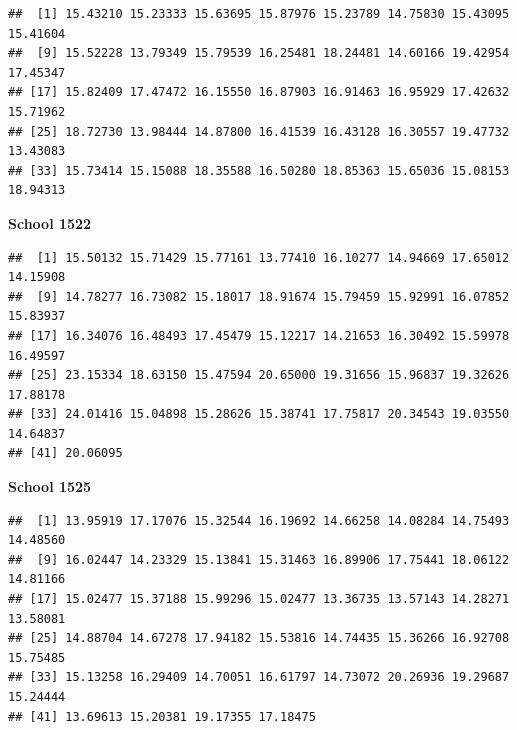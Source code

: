 \documentclass[
  12pt,
]{book}
\newenvironment{Shaded}{\begin{snugshade}}{\end{snugshade}}
\newcommand{\AttributeTok}[1]{\textcolor[rgb]{0.77,0.63,0.00}{#1}}
\newcommand{\DecValTok}[1]{\textcolor[rgb]{0.00,0.00,0.81}{#1}}
\newcommand{\FunctionTok}[1]{\textcolor[rgb]{0.00,0.00,0.00}{#1}}
\newcommand{\NormalTok}[1]{#1}
\newcommand{\SpecialCharTok}[1]{\textcolor[rgb]{0.00,0.00,0.00}{#1}}
\begin{document}
\begin{verbatim}
##  [1] 15.43210 15.23333 15.63695 15.87976 15.23789 14.75830 15.43095 15.41604
##  [9] 15.52228 13.79349 15.79539 16.25481 18.24481 14.60166 19.42954 17.45347
## [17] 15.82409 17.47472 16.15550 16.87903 16.91463 16.95929 17.42632 15.71962
## [25] 18.72730 13.98444 14.87800 16.41539 16.43128 16.30557 19.47732 13.43083
## [33] 15.73414 15.15088 18.35588 16.50280 18.85363 15.65036 15.08153 18.94313
\end{verbatim}

\textbf{School 1522}

\begin{Shaded}
\end{Shaded}

\begin{verbatim}
##  [1] 15.50132 15.71429 15.77161 13.77410 16.10277 14.94669 17.65012 14.15908
##  [9] 14.78277 16.73082 15.18017 18.91674 15.79459 15.92991 16.07852 15.83937
## [17] 16.34076 16.48493 17.45479 15.12217 14.21653 16.30492 15.59978 16.49597
## [25] 23.15334 18.63150 15.47594 20.65000 19.31656 15.96837 19.32626 17.88178
## [33] 24.01416 15.04898 15.28626 15.38741 17.75817 20.34543 19.03550 14.64837
## [41] 20.06095
\end{verbatim}

\textbf{School 1525}

\begin{Shaded}
\end{Shaded}

\begin{verbatim}
##  [1] 13.95919 17.17076 15.32544 16.19692 14.66258 14.08284 14.75493 14.48560
##  [9] 16.02447 14.23329 15.13841 15.31463 16.89906 17.75441 18.06122 14.81166
## [17] 15.02477 15.37188 15.99296 15.02477 13.36735 13.57143 14.28271 13.58081
## [25] 14.88704 14.67278 17.94182 15.53816 14.74435 15.36266 16.92708 15.75485
## [33] 15.13258 16.29409 14.70051 16.61797 14.73072 20.26936 19.29687 15.24444
## [41] 13.69613 15.20381 19.17355 17.18475
\end{verbatim}
\end{document}
